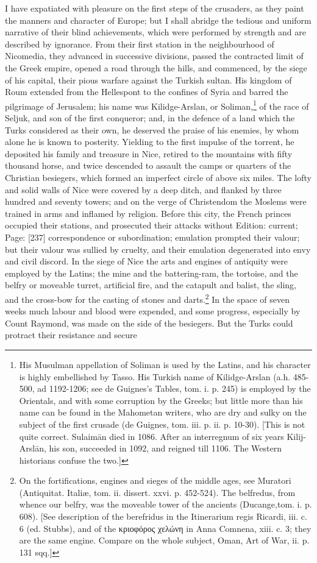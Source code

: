 I have expatiated with pleasure on the first steps of the crusaders, as they paint the manners and character of Europe; but I shall abridge the tedious and uniform narrative of their blind achievements, which were performed by strength and are described by ignorance. From their first station in the neighbourhood of Nicomedia, they advanced in successive divisions, passed the contracted limit of the Greek empire, opened a road through the hills, and commenced, by the siege of his capital, their pious warfare against the Turkish sultan. His kingdom of Roum extended from the Hellespont to the confines of Syria and barred the pilgrimage of Jerusalem; his name was Kilidge-Arslan, or Soliman,\footnote{His Musulman appellation of Soliman is used by the Latins, and his character is highly embellished by Tasso. His Turkish name of Kilidge-Arslan (a.h. 485-500, ad 1192-1206; see de Guignes\texthebrew{}’s Tables, tom. i. p. 245) is employed by the Orientals, and with some corruption by the Greeks; but little more than his name can be found in the Mahometan writers, who are dry and sulky on the subject of the first crusade (de Guignes, tom. iii. p. ii. p. 10-30). [This is not quite correct. Sulaimān died in 1086. After an interregnum of six years Kilij-Arslān, his son, succeeded in 1092, and reigned till 1106. The Western historians confuse the two.]} of the race of Seljuk, and son of the first conqueror; and, in the defence of a land which the Turks considered as their own, he deserved the praise of his enemies, by whom alone he is known to posterity. Yielding to the first impulse of the torrent, he deposited his family and treasure in Nice, retired to the mountains with fifty thousand horse, and twice descended to assault the camps or quarters of the Christian besiegers, which formed an imperfect circle of above six miles. The lofty and solid walls of Nice were covered by a deep ditch, and flanked by three hundred and seventy towers; and on the verge of Christendom the Moslems were trained in arms and inflamed by religion. Before this city, the French princes occupied their stations, and prosecuted their attacks without Edition: current; Page: [237] correspondence or subordination; emulation prompted their valour; but their valour was sullied by cruelty, and their emulation degenerated into envy and civil discord. In the siege of Nice the arts and engines of antiquity were employed by the Latins; the mine and the battering-ram, the tortoise, and the belfry or moveable turret, artificial fire, and the catapult and balist, the sling, and the cross-bow for the casting of stones and darts.\footnote{On the fortifications, engines and sieges of the middle ages, see Muratori (Antiquitat. Italiæ, tom. ii. dissert. xxvi. p. 452-524). The belfredus, from whence our belfry, was the moveable tower of the ancients (Ducange,tom. i. p. 608). [See description of the berefridus in the Itinerarium regis Ricardi, iii. c. 6 (ed. Stubbs), and of the \textgreek{κριοφόρος χελώνη} in Anna Comnena, xiii. c. 3; they are the same engine. Compare on the whole subject, Oman, Art of War, ii. p. 131 sqq.]} In the space of seven weeks much labour and blood were expended, and some progress, especially by Count Raymond, was made on the side of the besiegers. But the Turks could protract their resistance and secure 